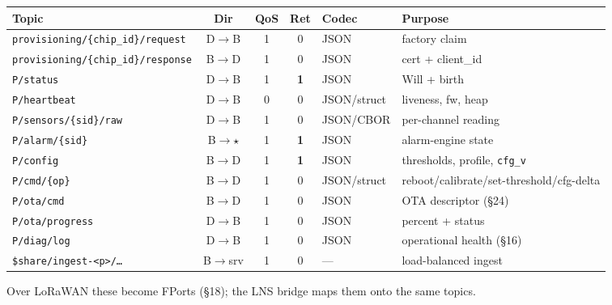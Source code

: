 \begin{center}
\renewcommand{\arraystretch}{1.12}\footnotesize
\begin{tabularx}{\textwidth}{@{}l c c c l X@{}}
\toprule
\textbf{Topic} & \textbf{Dir} & \textbf{QoS} & \textbf{Ret} & \textbf{Codec} & \textbf{Purpose} \\
\midrule
\texttt{provisioning/\{chip\_id\}/request}  & D$\to$B & 1 & 0 & JSON & factory claim \\
\texttt{provisioning/\{chip\_id\}/response} & B$\to$D & 1 & 0 & JSON & cert + client\_id \\
\texttt{P/status}            & D$\to$B & 1 & \textbf{1} & JSON & Will + birth \\
\texttt{P/heartbeat}         & D$\to$B & 0 & 0 & JSON/struct & liveness, fw, heap \\
\texttt{P/sensors/\{sid\}/raw}& D$\to$B & 1 & 0 & JSON/CBOR & per-channel reading \\
\texttt{P/alarm/\{sid\}}     & B$\to\star$ & 1 & \textbf{1} & JSON & alarm-engine state \\
\texttt{P/config}            & B$\to$D & 1 & \textbf{1} & JSON & thresholds, profile, \texttt{cfg\_v} \\
\texttt{P/cmd/\{op\}}        & B$\to$D & 1 & 0 & JSON/struct & reboot/calibrate/set-threshold/cfg-delta \\
\texttt{P/ota/cmd}           & B$\to$D & 1 & 0 & JSON & OTA descriptor (\S24) \\
\texttt{P/ota/progress}      & D$\to$B & 1 & 0 & JSON & percent + status \\
\texttt{P/diag/log}          & D$\to$B & 1 & 0 & JSON & operational health (\S16) \\
\texttt{\$share/ingest-<p>/\dots} & B$\to$srv & 1 & 0 & --- & load-balanced ingest \\
\bottomrule
\end{tabularx}
\end{center}
{\footnotesize Over LoRaWAN these become FPorts (\S18); the LNS bridge maps them onto the same topics.}

